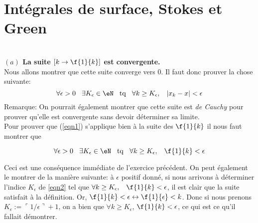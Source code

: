 
\section{Intégrales de surface, Stokes et Green}


\setcounter{CountExercice}{0}


\\

{\bf $(a)$ La suite $[k\rightarrow \f{1}{k}]$ est convergente.}\\

\noindent Nous allons montrer que cette suite converge vers $0$. Il faut donc prouver la chose suivante: 
   \begin{equation}\label{eqn1}\forall \epsilon >0 \hspace{0,3cm} \exists K_\epsilon \in \eN \hspace{0,3cm} {\rm tq}  \hspace{0,3cm}  \forall k\geq K_\epsilon, \hspace{0,3cm}  |x_k-x|<\epsilon\end{equation}
{Remarque}: On pourrait également montrer que cette suite est {\it de Cauchy} pour prouver qu'elle est convergente sans devoir déterminer sa limite.\\

\noindent Pour prouver que (\ref{eqn1}) s'applique bien à la suite des $\f{1}{k}$ il nous faut montrer que

   \begin{equation}\label{eqn2}\forall \epsilon >0 \hspace{0,3cm} \exists K_\epsilon \in \eN \hspace{0,3cm} {\rm tq}  \hspace{0,3cm}  \forall k\geq K_\epsilon,  \hspace{0,3cm} \f{1}{k}<\epsilon\end{equation}

   \noindent Ceci est une conséquence immédiate de l'exercice précédent. On peut également le montrer de la manière suivante: à $\epsilon$ positif donné, si nous arrivons à déterminer l'indice $K_\epsilon$ de \eqref{eqn2} tel que $\forall k\geq K_\epsilon,  \hspace{0,3cm} \f{1}{k}<\epsilon$, il est clair que la suite satisfait à la définition. Or, $\f{1}{k} < \epsilon \leftrightarrow \f{1}{\epsilon} <k$. Donc si nous prenons $K_\epsilon := \ulcorner  1/\epsilon \urcorner+1$, on a bien que $\forall k\geq K_\epsilon$, $\f{1}{k}<\epsilon$, ce qui est ce qu'il fallait démontrer.

